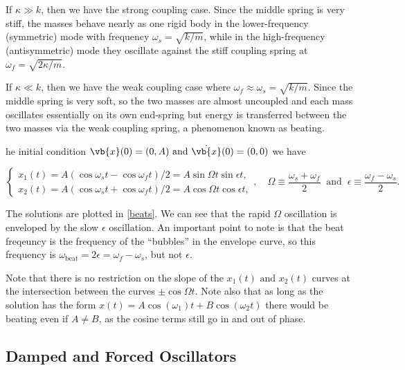 \documentclass[a4paper,12pt]{report}
\begin{document}
If \(\kappa \gg k\), then we have the strong coupling case. Since the middle spring is very stiff, the masses behave nearly as one rigid body in the lower-frequency (symmetric) mode with frequency \(\omega _{s} = \sqrt{k/m}  \), while in the high-frequency (antisymmetric) mode they oscillate against the stiff coupling spring at \(\omega _{f}  =\sqrt{2\kappa /m}  \). 

If \(\kappa \ll k\), then we have the weak coupling case where \(\omega _{f} \approx \omega _{s} = \sqrt{k /m}  \). Since the middle spring is very soft, so the two masses are almost uncoupled and each mass oscillates essentially on its own end-spring but energy is transferred between the two masses via the weak coupling spring, a phenomenon known as beating. 

he initial condition \(\vb{x} (0) = (0,A) \text { and } \dot{\vb{x} }(0) = (0,0) \) we have 

\begin{equation}
	\begin{cases}
		x_1 (t) = A(\cos \omega _{s}t - \cos \omega _{f}t ) /2 = A \sin \Omega t \sin \epsilon t,\\
		x_2 (t) = A(\cos \omega _{s}t + \cos \omega _{f}t ) /2 = A \cos \Omega t \cos \epsilon t,
	\end{cases}, \quad \Omega \equiv \frac{\omega _{s}+\omega _{f}  }{2} ~\text { and }~ \epsilon \equiv \frac{\omega _{f}-\omega _{s}  }{2}.  
\end{equation}

The solutions are plotted in \cref{beats}. We can see that the rapid \(\Omega \) oscillation is enveloped by the slow \(\epsilon \) oscillation. An important point to note is that the beat freqeuncy is the frequency of the ``bubbles'' in the envelope curve, so this frequency is \(\omega _{\text{beat} } = 2 \epsilon = \omega _{f}-\omega _{s}  \), but not \(\epsilon \).    


Note that there is no restriction on the slope of the \(x_1 (t) \text { and } x_2 (t)\) curves at the intersection between the curves \(\pm \cos \Omega t\). Note also that as long as the solution has the form \(x(t) = A \cos (\omega _{1})t + B \cos (\omega _{2} t) \) there would be beating even if \(A \neq B\), as the cosine terms still go in and out of phase.  

\subsection{Damped and Forced Oscillators}
\end{document}
